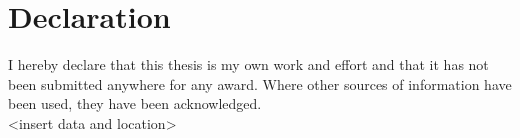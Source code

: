 \thispagestyle{empty}

\chapter*{Declaration}
I hereby declare that this thesis is my own work and effort and that it has not
been submitted anywhere for any award. Where other sources of information have
been used, they have been acknowledged.
%
\mbox{}\vspace{4\baselineskip}\\
%
<insert data and location> 
\clearpage\mbox{}\thispagestyle{empty}


%

